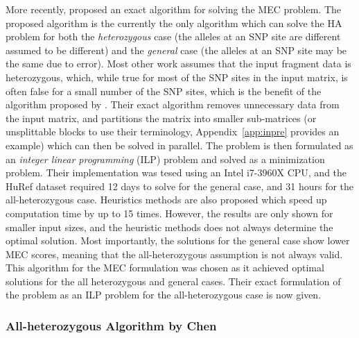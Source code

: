 \documentclass[10pt,a4paer,twocolumn]{article}
\begin{document}
More recently, \cite{chen:2013} proposed an exact algorithm for solving the MEC problem. The proposed
algorithm is the currently the only algorithm which can solve the HA problem for both the \textit{heterozygous}
case (the alleles at an SNP site are different assumed to be different) and the \textit{general} case (the 
alleles at an SNP site may be the same due to error). Most other work assumes that the input fragment data is 
heterozygous, which, while true for most of the SNP sites in the input matrix, is often false for a small 
number of the SNP sites, which is the benefit of the algorithm proposed by \cite{chen:2013}. Their exact
algorithm removes unnecessary data from the input matrix, and partitions the matrix into smaller sub-matrices
(or unsplittable blocks to use their terminology, Appendix~\ref{app:inpre} provides an example) which can then 
be solved in parallel. The problem is then formulated as an \textit{integer linear programming} (ILP) problem 
and solved as a minimization problem. Their implementation was tesed using an Intel i7-3960X CPU, and the 
HuRef dataset required 12 days to solve for the general case, and 31 hours for the all-heterozygous case. 
Heuristics methods are also proposed which speed up computation time by up to 15 times. However, the results 
are only shown for smaller input sizes, and the heuristic methods does  not always determine the optimal 
solution. Most importantly, the solutions for the general case show lower MEC scores, meaning that the 
all-heterozygous assumption is not always valid. This algorithm for the MEC formulation was chosen as it
achieved optimal solutions for the all heterozygous and general cases. Their exact formulation of the problem
as an ILP problem for the all-heterozygous case is now given.

\subsubsection{All-heterozygous Algorithm by Chen} \label{sec:allhetro}
\end{document}
